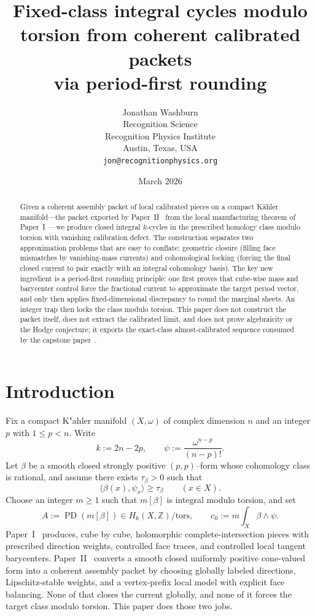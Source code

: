 \documentclass[11pt]{article}
\title{Fixed-class integral cycles modulo torsion from coherent calibrated packets\\via period-first rounding}
\author{Jonathan Washburn\\
Recognition Science\\
Recognition Physics Institute\\
Austin, Texas, USA\\
\texttt{jon@recognitionphysics.org}}
\date{March 2026}
\numberwithin{equation}{section}
\theoremstyle{plain}
\theoremstyle{definition}
\theoremstyle{remark}
\DeclareMathOperator{\PD}{PD}
\newcommand{\Z}{\mathbb{Z}}
\begin{document}
\maketitle

\begin{abstract}
Given a coherent assembly packet of local calibrated pieces on a compact K\"ahler manifold---the packet exported by Paper~II~\cite[Thm.~1.1]{Washburn26II} from the local manufacturing theorem of Paper~I~\cite[Thm.~1.1]{Washburn26I}---we produce closed integral $k$-cycles in the prescribed homology class modulo torsion with vanishing calibration defect.  The construction separates two approximation problems that are easy to conflate: geometric closure (filling face mismatches by vanishing-mass currents) and cohomological locking (forcing the final closed current to pair exactly with an integral cohomology basis).  The key new ingredient is a period-first rounding principle: one first proves that cube-wise mass and barycenter control force the fractional current to approximate the target period vector, and only then applies fixed-dimensional discrepancy to round the marginal sheets.  An integer trap then locks the class modulo torsion.  This paper does not construct the packet itself, does not extract the calibrated limit, and does not prove algebraicity or the Hodge conjecture; it exports the exact-class almost-calibrated sequence consumed by the capstone paper~\cite{Washburn26IV}.
\end{abstract}

\section{Introduction}

Fix a compact K"ahler manifold $(X,\omega)$ of complex dimension $n$ and an integer $p$ with $1\le p<n$.  Write
\[
k:=2n-2p,
\qquad
\psi:=\frac{\omega^{n-p}}{(n-p)!}.
\]
Let $\beta$ be a smooth closed strongly positive $(p,p)$--form whose cohomology class is rational, and assume there exists $\tau_\beta>0$ such that
\[
\langle\beta(x),\psi_x\rangle\ge \tau_\beta
\qquad (x\in X).
\]
Choose an integer $m\ge 1$ such that $m[\beta]$ is integral modulo torsion, and set
\[
A:=\PD(m[\beta])\in H_k(X,\Z)/\mathrm{tors},
\qquad
c_0:=m\int_X \beta\wedge\psi.
\]
Paper~I~\cite[Thm.~1.1]{Washburn26I} produces, cube by cube, holomorphic complete-intersection pieces with prescribed direction weights, controlled face traces, and controlled local tangent barycenters.  Paper~II~\cite[Thm.~1.1]{Washburn26II} converts a smooth closed uniformly positive cone-valued form into a coherent assembly packet by choosing globally labeled directions, Lipschitz-stable weights, and a vertex-prefix local model with explicit face balancing.  None of that closes the current globally, and none of it forces the target class modulo torsion.  This paper does those two jobs.
\end{document}
